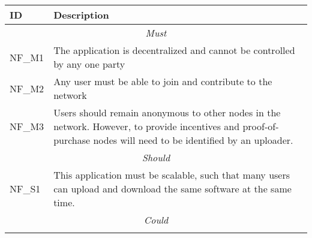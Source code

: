 \begin{longtable}{ p{} p{} }
  \toprule
  \textbf{ID} & \textbf{Description}
  \\\midrule\midrule
  \multicolumn{2}{c}{\cellcolor{red!70}\textit{Must}}\\\midrule
  NF\_M1 & The application is decentralized and cannot be controlled by any one party\\
  NF\_M2 & Any user must be able to join and contribute to the network\\
  NF\_M3 & Users should remain anonymous to other nodes in the network. However, to provide incentives and proof-of-purchase nodes will need to be identified by an uploader. \\
  \midrule\multicolumn{2}{c}{\cellcolor{orange!70}\textit{Should}}\\\midrule
  NF\_S1 & This application must be scalable, such that many users can upload and download the same software at the same time.\\
  \midrule\multicolumn{2}{c}{\cellcolor{green}\textit{Could}}\\\midrule
  \\
  \midrule
  \bottomrule
\end{longtable}